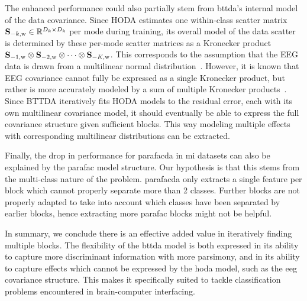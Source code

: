 \documentclass[twocolumn]{article}
\begin{document}
The enhanced performance could also partially stem from \ac{bttda}'s internal
model of the data covariance.
Since HODA estimates one within-class scatter matrix
$\mathbf{S}_{-k,\text{w}}\in\mathbb{R}^{D_k\times D_k}$ per mode during training,
its overall model of the data scatter is determined by these per-mode scatter matrices as a
Kronecker product $\mathbf{S}_{-1,\text{w}}\otimes \mathbf{S}_{-2,\text{w}}\otimes\cdots\otimes \mathbf{S}_{-K,\text{w}}$.
This corresponds to the assumption that the EEG data is
drawn from a multilinear normal distribution~\cite{Ohlson2013}.
However, it is known that EEG covariance cannot fully be expressed as a
single Kronecker product, but rather is more accurately modeled by a sum of
multiple Kronecker products~\cite{Bijma2005, Sosulski2022}.
Since BTTDA iteratively fits HODA models to the residual error, each with its own
multilinear covariance model, it should eventually be able to express the full
covariance structure given sufficient blocks.
This way modeling multiple effects with corresponding multilinear distributions
can be extracted.

Finally, the drop in performance for \ac{parafacda} in \ac{mi} datasets can also be
explained by the \ac{parafac} model structure.
Our hypothesis is that this stems from the multi-class nature of the problem.
\Ac{parafacda} only extracts a single feature per block which cannot properly
separate more than 2 classes.
Further blocks are not properly adapted to take into account which classes
have been separated by earlier blocks, hence extracting more \ac{parafac}
blocks might not be helpful.

In summary, we conclude there is an effective	added value in iteratively finding
multiple blocks.
The flexibility of the \ac{bttda} model is both expressed in its ability
to capture more discriminant information with more parsimony,
and in its ability to capture effects which cannot be expressed by the \ac{hoda}
model, such as the \ac{eeg} covariance structure.
This makes it specifically suited to tackle classification problems encountered in
brain-computer interfacing.
\end{document}
